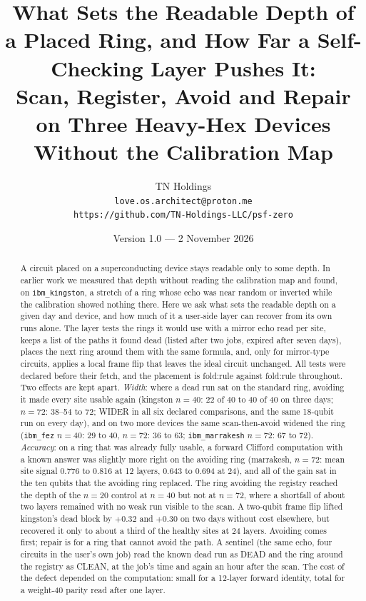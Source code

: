\documentclass[11pt]{article}
\title{What Sets the Readable Depth of a Placed Ring, and How Far a Self-Checking Layer Pushes It:\\
Scan, Register, Avoid and Repair on Three Heavy-Hex Devices Without the Calibration Map}
\author{TN Holdings\\
\texttt{love.os.architect@proton.me}\\
\texttt{https://github.com/TN-Holdings-LLC/psf-zero}}
\date{Version 1.0 --- 2 November 2026}
\begin{document}
\maketitle

\begin{abstract}
A circuit placed on a superconducting device stays readable only to some depth. In earlier work we measured that
depth without reading the calibration map and found, on \texttt{ibm\_kingston}, a stretch of a ring whose echo was
near random or inverted while the calibration showed nothing there. Here we ask what sets the readable depth on a
given day and device, and how much of it a user-side layer can recover from its own runs alone. The layer tests the
rings it would use with a mirror echo read per site, keeps a list of the paths it found dead (listed after two jobs,
expired after seven days), places the next ring around them with the same formula, and, only for mirror-type
circuits, applies a local frame flip that leaves the ideal circuit unchanged. All tests were declared before their
fetch, and the placement is fold:rule against fold:rule throughout. Two effects are kept apart. \emph{Width}: where a
dead run sat on the standard ring, avoiding it made every site usable again (kingston $n=40$: 22 of 40 to 40 of 40 on
three days; $n=72$: 38--54 to 72; WIDER in all six declared comparisons, and the same 18-qubit run on every day), and on two more devices the same scan-then-avoid widened the ring
(\texttt{ibm\_fez} $n=40$: 29 to 40, $n=72$: 36 to 63; \texttt{ibm\_marrakesh} $n=72$: 67 to 72). \emph{Accuracy}: on a
ring that was already fully usable, a forward Clifford computation with a known answer was slightly more right on the
avoiding ring (marrakesh, $n=72$: mean site signal 0.776 to 0.816 at 12 layers, 0.643 to 0.694 at 24), and all of the
gain sat in the ten qubits that the avoiding ring replaced. The ring avoiding the registry reached the depth of the
$n=20$ control at $n=40$ but not at $n=72$, where a shortfall of about two layers remained with no weak run visible to
the scan. A two-qubit frame flip lifted kingston's dead block by $+0.32$ and $+0.30$ on two days without cost
elsewhere, but recovered it only to about a third of the healthy sites at 24 layers. Avoiding comes first; repair is for
a ring that cannot avoid the path. A sentinel (the same echo, four circuits in the user's own job) read the known
dead run as DEAD and the ring around the registry as CLEAN, at the job's time and again an hour after the scan. The
cost of the defect depended on the computation: small for a 12-layer forward identity, total for a weight-40 parity
read after one layer.
\end{abstract}
\end{document}
